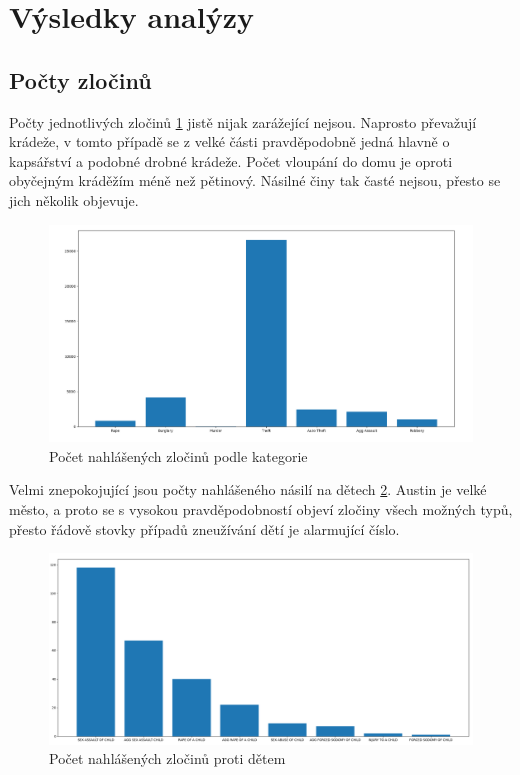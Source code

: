 \documentclass{article}
\begin{document}
\section{Výsledky analýzy}

\subsection{Počty zločinů}

Počty jednotlivých zločinů \ref{fig:crime_counts} jistě nijak zarážející nejsou. Naprosto
převažují krádeže, v tomto případě se z velké části pravděpodobně jedná hlavně o kapsářství
a podobné drobné krádeže. Počet vloupání do domu je oproti obyčejným kráděžím méně
než pětinový. Násilné činy tak časté nejsou, přesto se jich několik objevuje.

\begin{figure}
  \includegraphics[width=1.4\textwidth]{figures/crime_counts.png}
  \caption{Počet nahlášených zločinů podle kategorie}
  \label{fig:crime_counts}
\end{figure}

Velmi znepokojující jsou počty nahlášeného násilí na dětech \ref{fig:crime_against_children}.
Austin je velké město, a proto se s vysokou pravděpodobností objeví zločiny všech možných typů,
přesto řádově stovky případů zneužívání dětí je alarmující číslo.

\begin{figure}
  \centering
  \includegraphics[width=1.4\textwidth]{figures/crime_against_children.png}
  \caption{Počet nahlášených zločinů proti dětem}
  \label{fig:crime_against_children}
\end{figure}
\end{document}
